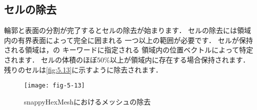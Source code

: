 \subsection{セルの除去}
\label{ssec:5.4.4}
%
輪郭と表面の分割が完了するとセルの除去が始まります．
セルの除去には領域内の有界表面によって完全に囲まれる
一つ以上の範囲が必要です．
セルが保持される領域は，の
%
%
キーワードに指定される
領域内の位置ベクトルによって特定されます．
セルの体積のほぼ$50\unit{\%}$以上が領域内に存在する場合保持されます．
残りのセルは\autoref{fig:5.13}に示すように除去されます．


\begin{figure}[ht]
 \texttt{[image: fig-5-13]}
 \caption{snappyHexMeshにおけるメッシュの除去}
 \label{fig:5.13}
\end{figure}


